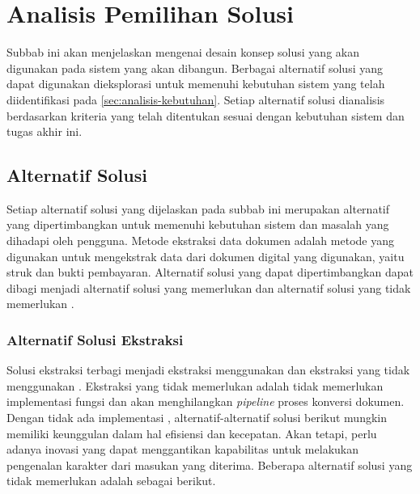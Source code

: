 \section{Analisis Pemilihan Solusi}
\label{sec:analisis-pemilihan-solusi}

Subbab ini akan menjelaskan mengenai desain konsep solusi yang akan digunakan pada sistem yang akan dibangun. Berbagai alternatif solusi yang dapat digunakan dieksplorasi untuk memenuhi kebutuhan sistem yang telah diidentifikasi pada \autoref{sec:analisis-kebutuhan}. Setiap alternatif solusi dianalisis berdasarkan kriteria yang telah ditentukan sesuai dengan kebutuhan sistem dan tugas akhir ini.

\subsection{Alternatif Solusi}
\label{subsec:alternatif-solusi}
Setiap alternatif solusi yang dijelaskan pada subbab ini merupakan alternatif yang dipertimbangkan untuk memenuhi kebutuhan sistem dan masalah yang dihadapi oleh pengguna. Metode ekstraksi data dokumen adalah metode yang digunakan untuk mengekstrak data dari dokumen digital yang digunakan, yaitu struk dan bukti pembayaran. Alternatif solusi yang dapat dipertimbangkan dapat dibagi menjadi alternatif solusi yang memerlukan \ocr{} dan alternatif solusi yang tidak memerlukan \ocr. 

\subsubsection{Alternatif Solusi Ekstraksi}
\label{subsubsec:alternatif-solusi-ekstraksi}
Solusi ekstraksi terbagi menjadi ekstraksi menggunakan \ocr{} dan ekstraksi yang tidak menggunakan \ocr. Ekstraksi yang tidak memerlukan \ocr{} adalah tidak memerlukan implementasi fungsi \ocr{} dan akan menghilangkan \emph{pipeline} proses konversi dokumen. Dengan tidak ada implementasi \ocr, alternatif-alternatif solusi berikut mungkin memiliki keunggulan dalam hal efisiensi dan kecepatan. Akan tetapi, perlu adanya inovasi yang dapat menggantikan  kapabilitas \ocr{} untuk melakukan pengenalan karakter dari masukan yang diterima. Beberapa alternatif solusi yang tidak memerlukan \ocr{} adalah sebagai berikut.

